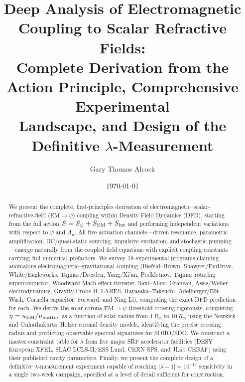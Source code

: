 \documentclass[aps,prd,twocolumn,superscriptaddress,floatfix,nofootinbib]{revtex4-2}
\newcommand{\Rsun}{R_\odot}
\begin{document}
\title{Deep Analysis of Electromagnetic Coupling to Scalar Refractive Fields:\\
Complete Derivation from the Action Principle, Comprehensive Experimental\\
Landscape, and Design of the Definitive $\lambda$-Measurement}

\author{Gary Thomas Alcock}

\date{\today}

\begin{abstract}
We present the complete, first-principles derivation of
electromagnetic--scalar-refractive-field ($\text{EM}\to\psi$) coupling
within Density Field Dynamics (DFD), starting from the full action
$S = S_\psi + S_{\rm EM} + S_{\rm int}$ and performing independent
variations with respect to $\psi$ and $A_\mu$. All five actuation
channels---driven resonance, parametric amplification, DC/quasi-static
sourcing, impulsive excitation, and stochastic pumping---emerge naturally
from the coupled field equations with explicit coupling constants carrying
full numerical prefactors. We survey 18 experimental programs claiming
anomalous electromagnetic--gravitational coupling (Biefeld--Brown,
Shawyer/EmDrive, White/Eagleworks, Tajmar/Dresden, Yang/Xi'an, Podkletnov,
Tajmar rotating superconductor, Woodward Mach-effect thruster, Saxl--Allen,
Graneau, Assis/Weber electrodynamics, Gravity Probe B, LARES,
Hayasaka--Takeuchi, Adelberger/E\"ot-Wash, Cornella capacitor, Forward,
and Ning Li), computing the exact DFD prediction for each. We derive the
solar corona $\text{EM}\to\psi$ threshold crossing rigorously, computing
$\eta = u_{\rm EM}/u_{\rm matter}$ as a function of solar radius from
$1\,\Rsun$ to $10\,\Rsun$ using the Newkirk and Guhathakurta--Holzer
coronal density models, identifying the precise crossing radius and
predicting observable spectral signatures for SOHO/SDO. We construct a
master constraint table for $\lambda$ from five major SRF accelerator
facilities (DESY European XFEL, SLAC LCLS-II, ESS Lund, CERN SPS, and
JLab CEBAF) using their published cavity parameters. Finally, we present
the complete design of a definitive $\lambda$-measurement experiment
capable of reaching $|\lambda - 1| = 10^{-14}$ sensitivity in a single
two-week campaign, specified at a level of detail sufficient for
construction.
\end{abstract}

\maketitle
\tableofcontents
\end{document}
